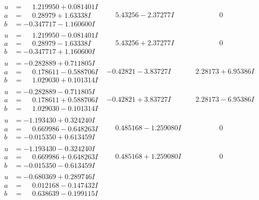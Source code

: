 \documentclass[1p]{elsarticle_modified}
\theoremstyle{definition}
\begin{document}
$$\begin{array}{c|c|c}
\begin{aligned}
u &= \phantom{-}1.219950 + 0.081401 I \\
a &= \phantom{-}0.28979 + 1.63338 I \\
b &= -0.347717 - 1.160600 I\end{aligned}
 & \phantom{-}5.43256 - 2.37277 I & \phantom{-0.000000 } 0 \\ \hline\begin{aligned}
u &= \phantom{-}1.219950 - 0.081401 I \\
a &= \phantom{-}0.28979 - 1.63338 I \\
b &= -0.347717 + 1.160600 I\end{aligned}
 & \phantom{-}5.43256 + 2.37277 I & \phantom{-0.000000 } 0 \\ \hline\begin{aligned}
u &= -0.282889 + 0.711805 I \\
a &= \phantom{-}0.178611 - 0.588706 I \\
b &= \phantom{-}1.029030 + 0.101314 I\end{aligned}
 & -0.42821 - 3.83727 I & \phantom{-}2.28173 + 6.95386 I \\ \hline\begin{aligned}
u &= -0.282889 - 0.711805 I \\
a &= \phantom{-}0.178611 + 0.588706 I \\
b &= \phantom{-}1.029030 - 0.101314 I\end{aligned}
 & -0.42821 + 3.83727 I & \phantom{-}2.28173 - 6.95386 I \\ \hline\begin{aligned}
u &= -1.193430 + 0.324240 I \\
a &= \phantom{-}0.669986 - 0.648263 I \\
b &= -0.015350 + 0.613459 I\end{aligned}
 & \phantom{-}0.485168 - 1.259080 I & \phantom{-0.000000 } 0 \\ \hline\begin{aligned}
u &= -1.193430 - 0.324240 I \\
a &= \phantom{-}0.669986 + 0.648263 I \\
b &= -0.015350 - 0.613459 I\end{aligned}
 & \phantom{-}0.485168 + 1.259080 I & \phantom{-0.000000 } 0 \\ \hline\begin{aligned}
u &= -0.680369 + 0.289746 I \\
a &= \phantom{-}0.012168 - 0.147432 I \\
b &= \phantom{-}0.638639 - 0.199115 I\end{aligned}

\end{array}$$
\end{document}
